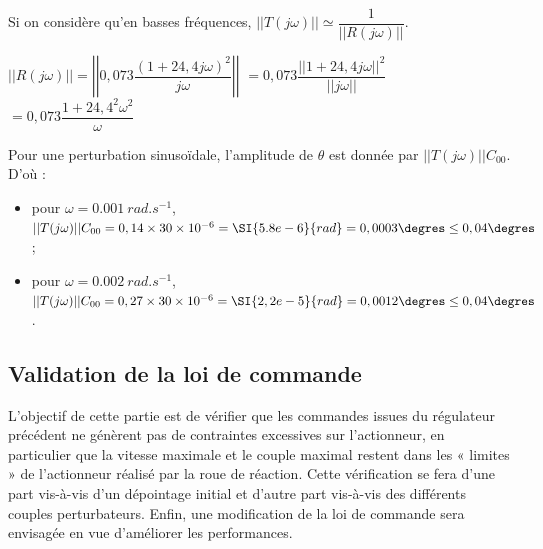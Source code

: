 \ifprof
\begin{corrige}

Si on considère qu'en basses fréquences,  $||T(j\omega)||\simeq \dfrac{1}{|| R\left(j\omega\right)||}$.


$|| R\left(j\omega\right)|| = \left|\left| 0,073  \dfrac{\left(1+24,4 j \omega\right)^2}{j\omega}\right|\right|$
$=0,073  \dfrac{ \left|\left| 1+24,4 j \omega \right|\right| ^2}{ \left|\left| j\omega\right|\right|}$
$=0,073  \dfrac{ 1+24,4^2  \omega^2 }{ \omega}$

Pour une perturbation sinusoïdale, l'amplitude de $\theta$ est donnée par $||T(j\omega)|| C_{00}$.  D'où :
\begin{itemize}
\item pour $\omega = \SI{0,001}{rad.s^{-1}}$, $||T(j\omega)|| C_{00} = 0,14 \times 30 \times 10^{-6} = \SI{5.8e-6}{rad} = 0,0003\degres\leq 0,04\degres$;
\item pour $\omega = \SI{0,002}{rad.s^{-1}}$, $||T(j\omega)|| C_{00} = 0,27 \times 30 \times 10^{-6} = \SI{2,2e-5}{rad} = 0,0012\degres\leq 0,04\degres$.
\end{itemize}
%  
\end{corrige}
\else
\fi

\subsection{\label{sec:3:D} Validation de la loi de commande}
\begin{obj}
L’objectif de cette partie est de vérifier que les commandes issues du régulateur précédent ne
génèrent pas de contraintes excessives sur l’actionneur, en particulier que la vitesse maximale
et le couple maximal restent dans les « limites » de l’actionneur réalisé par la roue de réaction.
Cette vérification se fera d’une part vis-à-vis d’un dépointage initial et d’autre part vis-à-vis des
différents couples perturbateurs. Enfin, une modification de la loi de commande sera envisagée en
vue d’améliorer les performances.
\end{obj}


